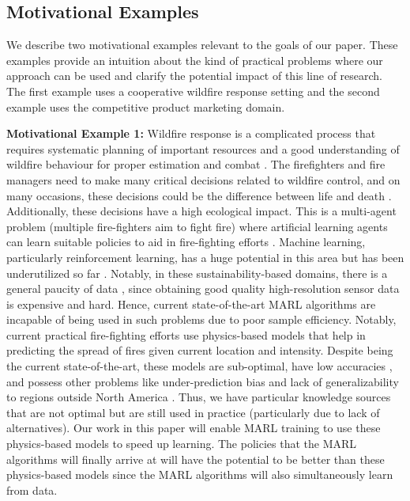 \documentclass[jair, twoside,11pt,theapa]{article}
\begin{document}

\subsection{Motivational Examples}\label{sec:motivationalexample}

We  describe two motivational examples relevant to the goals of our paper. These examples provide an intuition about the kind of practical problems where our approach can be used and clarify the potential impact of this line of research. The first example uses a cooperative wildfire response setting and the second example uses the competitive product marketing domain.  


\textbf{Motivational Example 1: }  Wildfire response is a  complicated process that requires systematic planning of important resources and a good understanding of wildfire behaviour for proper estimation and combat \citep{Thompson2018}. The firefighters and fire managers need to make many critical decisions related to wildfire control, and on many occasions, these decisions could be the difference between life and death \citep{thompson2019risk}. Additionally, these decisions have a high ecological impact. This is a multi-agent problem (multiple fire-fighters aim to fight fire) where artificial learning agents can learn suitable policies to aid in fire-fighting efforts \citep{nikitin2019development}. Machine learning, particularly reinforcement learning, has a huge potential  in this area but has been underutilized so far \citep{Jain2020}. Notably, in these sustainability-based domains, there is a general paucity of data \citep{tymstra2020wildfire}, since obtaining good quality high-resolution sensor data is expensive and hard. Hence, current state-of-the-art MARL algorithms are incapable of being used in such problems due to poor sample efficiency. Notably, current practical fire-fighting efforts use physics-based models \citep{rothermel1972mathematical} that help in predicting the spread of fires given current location and intensity. Despite being the current state-of-the-art, these models are  sub-optimal, have low accuracies \citep{jahdi2015evaluating}, and possess other problems like under-prediction bias and lack of generalizability to regions outside North America \citep{Cruz2010}. Thus, we have particular knowledge sources that are not optimal but are still used in practice (particularly due to lack of alternatives). Our work in this paper will enable MARL training to use these physics-based models to speed up learning. The policies that the MARL algorithms will finally arrive at will have the potential to be better than these physics-based models since the MARL algorithms will also simultaneously learn from data. 
\end{document}
